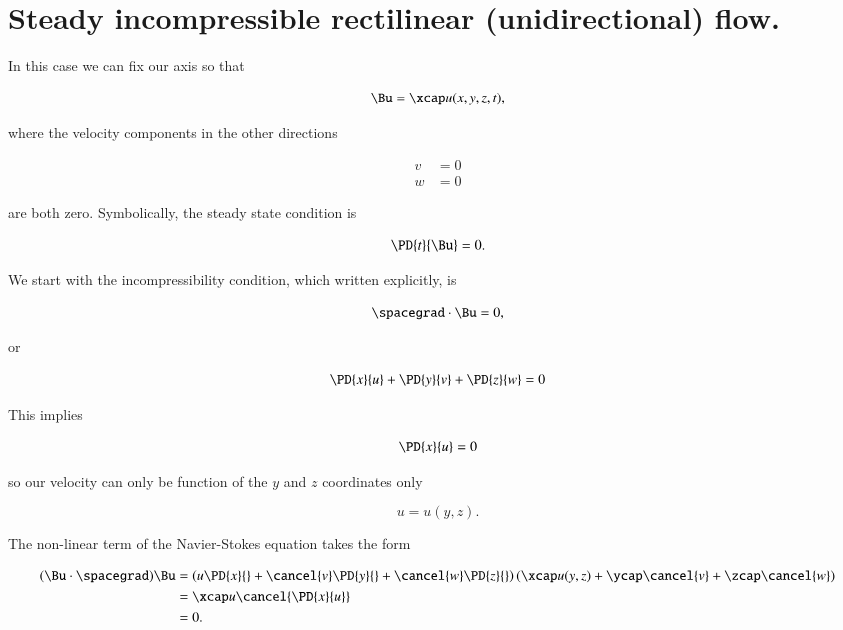 \section{Steady incompressible rectilinear (unidirectional) flow.}

In this case we can fix our axis so that

\begin{equation}\label{eqn:continuumL11:170}
\Bu = \xcap u(x, y, z, t),
\end{equation}

where the velocity components in the other directions

\begin{align}\label{eqn:continuumL11:190}
v &= 0 \\
w &= 0
\end{align}

are both zero.  Symbolically, the steady state condition is 

\begin{equation}\label{eqn:continuumL11:210}
\PD{t}{\Bu} = 0.
\end{equation}

We start with the incompressibility condition, which written explicitly, is

\begin{equation}\label{eqn:continuumL11:230}
\spacegrad \cdot \Bu = 0,
\end{equation}

or

\begin{equation}\label{eqn:continuumL11:250}
\PD{x}{u} + \PD{y}{v} + \PD{z}{w} = 0
\end{equation}

This implies 

\begin{equation}\label{eqn:continuumL11:270}
\PD{x}{u} = 0
\end{equation}

so our velocity can only be function of the $y$ and $z$ coordinates only

\begin{equation}\label{eqn:continuumL11:290}
u = u(y, z).
\end{equation}

The non-linear term of the Navier-Stokes equation takes the form

\begin{align*}
(\Bu \cdot \spacegrad) \Bu
&=
\left(u \PD{x}{}
+\cancel{v} \PD{y}{}
+\cancel{w} \PD{z}{} \right) (\xcap u( y, z) + \ycap \cancel{v} + \zcap \cancel{w} ) \\
&= 
\xcap u \cancel{\PD{x}{u}} \\
&= 0.
\end{align*}


